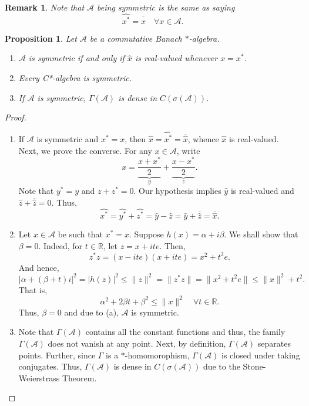 \documentclass[12pt]{article}
\theoremstyle{thmstyle}
\newtheorem{proposition}[theorem]{Proposition}
\theoremstyle{defstyle}
\newtheorem{remark}[theorem]{Remark}
\newcommand{\R}{\mathbb{R}}
\newcommand{\calA}{\mathcal{A}} %
\newcommand{\wh}[1]{\widehat{#1}}
\renewcommand{\le}{\leqslant}
\begin{document}
\begin{remark}
    Note that $\calA$ being symmetric is the same as saying 
    \begin{equation*}
        \wh{x^\ast} = \overline{\wh x} \quad\forall x\in\calA.
    \end{equation*}
\end{remark}

\begin{proposition}
    Let $\calA$ be a commutative Banach $\ast$-algebra. 
    \begin{enumerate}[label=(\alph*)]
        \item $\calA$ is symmetric if and only if $\wh x$ is real-valued whenever $x = x^\ast$.
        \item Every C*-algebra is symmetric.
        \item If $\calA$ is symmetric, $\Gamma(\calA)$ is dense in $C(\sigma(\calA))$.
    \end{enumerate}
\end{proposition}
\begin{proof}
\begin{enumerate}[label=(\alph*)]
\item If $\calA$ is symmetric and $x^\ast = x$, then $\wh x = \wh{x^\ast} = \overline{\wh x}$, whence $\wh x$ is real-valued. Next, we prove the converse. For any $x\in\calA$, write 
\begin{equation*}
    x = \underbrace{\frac{x + x^\ast}{2}}_y + \underbrace{\frac{x - x^\ast}{2}}_z.
\end{equation*}
Note that $y^\ast = y$ and $z + z^\ast = 0$. Our hypothesis implies $\wh y$ is real-valued and $\wh z + \overline{\wh z} = 0$. Thus, 
\begin{equation*}
    \wh{x^\ast} = \wh{y^\ast} + \wh{z^\ast} = \wh y - \wh{z} = \wh y + \overline{\wh z} = \overline{\wh x}.
\end{equation*}
\item Let $x\in\calA$ be such that $x^\ast = x$. Suppose $h(x) = \alpha + i\beta$. We shall show that $\beta = 0$. Indeed, for $t\in\R$, let $z = x + it e$. Then, 
\begin{equation*}
    z^\ast z = (x - ite)(x + ite) = x^2 + t^2e.
\end{equation*}
And hence, 
\begin{equation*}
    |\alpha + (\beta + t)i|^2 = |h(z)|^2\le \|z\|^2  = \|z^\ast z\| = \|x^2 + t^2e\|\le \|x\|^2 + t^2.
\end{equation*}
That is, 
\begin{equation*}
    \alpha^2 + 2\beta t + \beta^2\le\|x\|^2\quad\forall t\in\R.
\end{equation*}
Thus, $\beta = 0$ and due to (a), $\calA$ is symmetric.
\item Note that $\Gamma(\calA)$ contains all the constant functions and thus, the family $\Gamma(\calA)$ does not vanish at any point. Next, by definition, $\Gamma(\calA)$ separates points. Further, since $\Gamma$ is a $\ast$-homomorophism, $\Gamma(\calA)$ is closed under taking conjugates. Thus, $\Gamma(\calA)$ is dense in $C(\sigma(\calA))$ due to the Stone-Weierstrass Theorem. \qedhere
\end{enumerate}
\end{proof}
\end{document}
